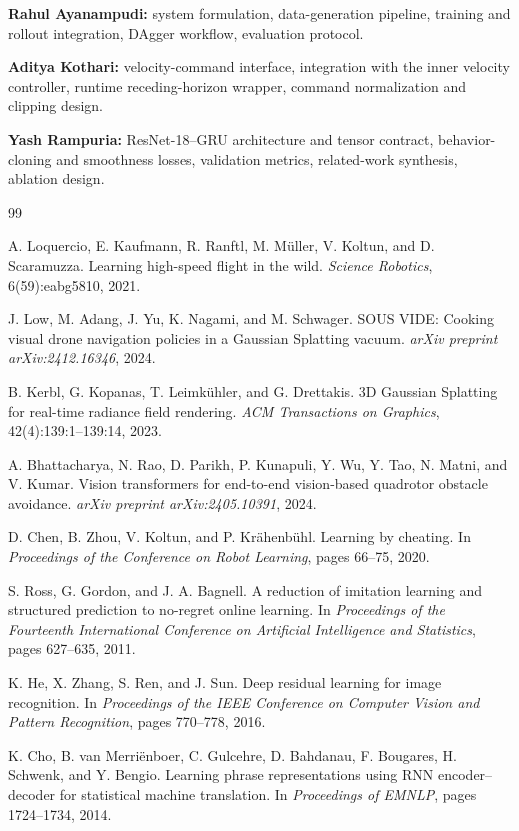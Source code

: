 \documentclass[10pt,twocolumn,letterpaper]{article}
\begin{document}
\textbf{Rahul Ayanampudi:} system formulation, data-generation pipeline, training and rollout integration, DAgger workflow, evaluation protocol.

\textbf{Aditya Kothari:} velocity-command interface, integration with the inner velocity controller, runtime receding-horizon wrapper, command normalization and clipping design.

\textbf{Yash Rampuria:} ResNet-18--GRU architecture and tensor contract, behavior-cloning and smoothness losses, validation metrics, related-work synthesis, ablation design.

\balance
{\small
\begin{thebibliography}{99}

A. Loquercio, E. Kaufmann, R. Ranftl, M. M\"uller, V. Koltun, and D. Scaramuzza.
Learning high-speed flight in the wild.
\emph{Science Robotics}, 6(59):eabg5810, 2021.

J. Low, M. Adang, J. Yu, K. Nagami, and M. Schwager.
{SOUS VIDE}: Cooking visual drone navigation policies in a Gaussian Splatting vacuum.
\emph{arXiv preprint arXiv:2412.16346}, 2024.

B. Kerbl, G. Kopanas, T. Leimk\"uhler, and G. Drettakis.
3D Gaussian Splatting for real-time radiance field rendering.
\emph{ACM Transactions on Graphics}, 42(4):139:1--139:14, 2023.

A. Bhattacharya, N. Rao, D. Parikh, P. Kunapuli, Y. Wu, Y. Tao, N. Matni, and V. Kumar.
Vision transformers for end-to-end vision-based quadrotor obstacle avoidance.
\emph{arXiv preprint arXiv:2405.10391}, 2024.

D. Chen, B. Zhou, V. Koltun, and P. Kr\"ahenb\"uhl.
Learning by cheating.
In \emph{Proceedings of the Conference on Robot Learning}, pages 66--75, 2020.

S. Ross, G. Gordon, and J. A. Bagnell.
A reduction of imitation learning and structured prediction to no-regret online learning.
In \emph{Proceedings of the Fourteenth International Conference on Artificial Intelligence and Statistics}, pages 627--635, 2011.

K. He, X. Zhang, S. Ren, and J. Sun.
Deep residual learning for image recognition.
In \emph{Proceedings of the IEEE Conference on Computer Vision and Pattern Recognition}, pages 770--778, 2016.

K. Cho, B. van Merri\"enboer, C. Gulcehre, D. Bahdanau, F. Bougares, H. Schwenk, and Y. Bengio.
Learning phrase representations using {RNN} encoder--decoder for statistical machine translation.
In \emph{Proceedings of EMNLP}, pages 1724--1734, 2014.


\end{thebibliography}}
\end{document}
